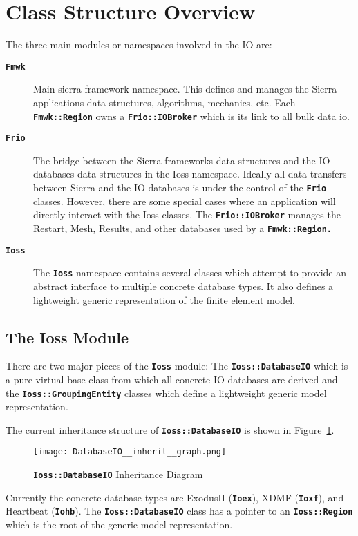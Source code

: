 \documentclass[11pt,twoside]{article}
\newcommand{\code}[1]
   {\mbox{\bf\tt #1}\null}
\begin{document}
\section{Class Structure Overview}
The three main modules or namespaces involved in the IO are:
\begin{description}
\item [\code{Fmwk}] Main sierra framework namespace. This
defines and manages the Sierra applications data structures,
algorithms, mechanics, etc. Each \code{Fmwk::Region} owns a
\code{Frio::IOBroker} which is its link to all bulk data io.
\item [\code{Frio}] The bridge between the Sierra frameworks
data structures and the IO databases data structures in the Ioss
namespace. Ideally all data transfers between Sierra and the IO
databases is under the control of the \code{Frio} classes.
However, there are some special cases where an application will
directly interact with the Ioss classes. The
\code{Frio::IOBroker} manages the Restart, Mesh, Results, and
other databases used by a \code{Fmwk::Region.}
\item [\code{Ioss}] The \code{Ioss} namespace
contains several classes which attempt to provide an abstract interface
to multiple concrete database types. It also defines a lightweight
generic representation of the finite element model.
\end{description}

\subsection{The Ioss Module}
There are two major pieces of the \code{Ioss} module: The
\code{Ioss::DatabaseIO} which is a pure virtual base class
from which all concrete IO databases are derived and the
\code{Ioss::GroupingEntity} classes which define a
lightweight generic model representation.

The current inheritance structure of
\code{Ioss::DatabaseIO} is shown in Figure~\ref{fig:dbio_inherit}.
\begin{figure}[htp]
\centering
\texttt{[image: DatabaseIO\_\_inherit\_\_graph.png]}
\caption{\code{Ioss::DatabaseIO} Inheritance Diagram}\label{fig:dbio_inherit}
\end{figure}
Currently the concrete database types are ExodusII (\code{Ioex}), XDMF
(\code{Ioxf}), and Heartbeat (\code{Iohb}). The
\code{Ioss::DatabaseIO} class has a pointer to an \code{Ioss::Region
}which is the root of the generic model representation.
\end{document}
